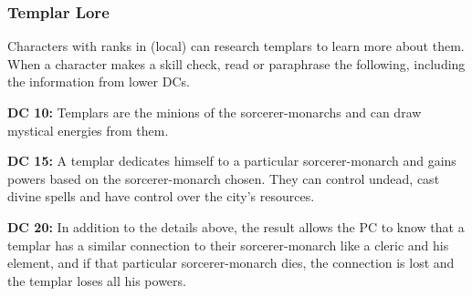 \subsubsection{Templar Lore}
Characters with ranks in  (local) can research templars to learn more about them. When a character makes a skill check, read or paraphrase the following, including the information from lower DCs.

\textbf{DC 10:} Templars are the minions of the sorcerer-monarchs and can draw mystical energies from them.

\textbf{DC 15:} A templar dedicates himself to a particular sorcerer-monarch and gains powers based on the sorcerer-monarch chosen. They can control undead, cast divine spells and have control over the city's resources.

\textbf{DC 20:} In addition to the details above, the result allows the PC to know that a templar has a similar connection to their sorcerer-monarch like a cleric and his element, and if that particular sorcerer-monarch dies, the connection is lost and the templar loses all his powers.
